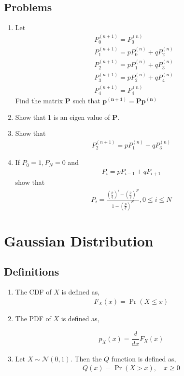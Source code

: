 \documentclass[journal,12pt,onecolumn]{IEEEtran}
\renewcommand\thesection{\arabic{section}}
\renewcommand\thesubsection{\thesection.\arabic{subsection}}
\providecommand{\pr}[1]{\ensuremath{\Pr\left(#1\right)}}
\theoremstyle{remark}
\numberwithin{equation}{section}
\let\vec\mathbf
\begin{document}
			


\subsection{Problems}
\begin{enumerate}[label=\arabic*.,ref=\thesubsection.\theenumi]
\item Let
\begin{align}
&P_0^{(n+1)} = P_0^{(n)}\\
&P_1^{(n+1)} = pP_0^{(n)} + qP_2^{(n)} \\
&P_2^{(n+1)} = pP_1^{(n)} + qP_3^{(n)} \\
&P_3^{(n+1)} = pP_2^{(n)} + qP_4^{(n)} \\
&P_4^{(n+1)} = P_4^{(n)}
\end{align}
Find the matrix $\vec{P}$ such that $\vec{p^{(n+1)}} = \vec{P}\vec{p^{(n)}}	$
\item Show that 1 is an eigen value of $\vec{P}.$
\item Show that 
\begin{align}
	P_2^{(n+1)} = pP_1^{(n)} + qP_3^{(n)}
\end{align}

\item If $P_0 =1, P_N = 0$ and
\begin{align}
P_i = p P_{i-1}+qP_{i+1}
\end{align}
	show that 
\begin{align}
P_i =	\frac{\left(\frac{p}{q}\right)^i-\left(\frac{p}{q}\right)^N}{1-\left(\frac{p}{q}\right)^N}, 0\leq i \leq N
\end{align}

\end{enumerate}
\section{Gaussian Distribution}
\subsection{Definitions}
\begin{enumerate}[label=\arabic*.,ref=\thesubsection.\theenumi]
\item The CDF of $X$ is defined as,
\begin{align}
	F_X(x) = \pr{X \leq x}
\end{align}
\item The PDF of $X$ is defined as,

\begin{align}
p_X(x) = \dfrac{d}{dx}F_X(x)
\end{align}
\item Let 
 $X \sim \mathcal{N}(0, 1)$.  Then the 
	$Q$ function is defined as,
\begin{align}
	Q(x) = \pr{X>x}, \quad x \ge 0
\end{align}
\end{enumerate}
\end{document}
